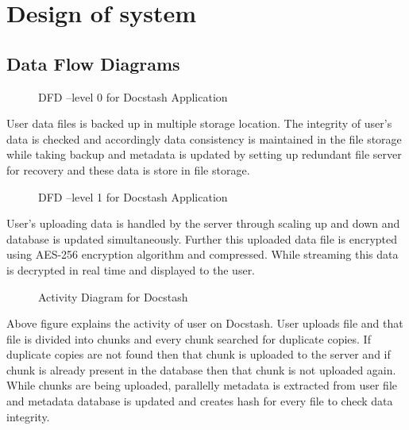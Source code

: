 \chapter{Design of system}
\newpage

\section{Data Flow Diagrams}
\begin{figure}[h]
  \begin{center}
    \caption{DFD –level 0 for Docstash Application }
    \label{7}
\end{center}
\end{figure}

\vspace{0.2cm} User data files is backed up in multiple storage location. The integrity of user's data is checked and accordingly data consistency is maintained in the file storage while taking backup and metadata is updated by setting up redundant file server for recovery and these data is store in file storage.

\begin{figure}[h]
\begin{center}
    \caption{DFD –level 1 for Docstash Application }
    \label{8}
\end{center}
\end{figure}

       \vspace{0.2cm}User's uploading data is handled by the server through scaling up and down and database is updated simultaneously. Further this uploaded data file is encrypted using AES-256 encryption algorithm and compressed. While streaming
           this data is decrypted in real time and displayed to the user.



\begin{figure}[h]
    \begin{center}
    \caption{Activity Diagram for Docstash }
    \label{9}
\end{center}
\end{figure}

\vspace{0.2cm}Above figure explains the activity of user on Docstash. User uploads file and that file is divided into chunks and every chunk searched for duplicate copies. If duplicate copies are not found then that chunk is uploaded to the server and if chunk is already present in the database then that chunk is not uploaded again. While chunks are being uploaded, parallelly metadata is extracted from user file and metadata database is updated and creates hash for every file to check data integrity.          
